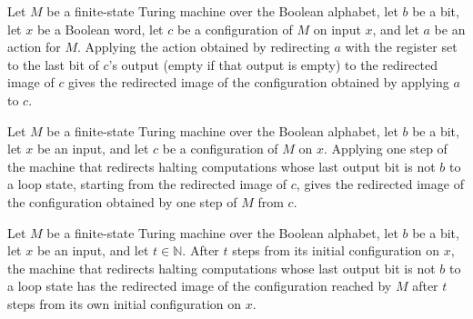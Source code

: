 \begin{lemma}
\label{Turing.FinTM.redirect_apply}
\leanok
{}
Let $M$ be a finite-state Turing machine over the Boolean alphabet, let $b$ be a bit,
let $x$ be a Boolean word, let $c$ be a configuration of $M$ on input $x$, and let $a$
be an action for $M$. Applying the action obtained by redirecting $a$ with the register
set to the last bit of $c$'s output (empty if that output is empty) to the redirected
image of $c$ gives the redirected image of the configuration obtained by applying $a$ to
$c$.
\end{lemma}

\begin{lemma}
\label{Turing.FinTM.redirect_step}
\leanok
{}
Let $M$ be a finite-state Turing machine over the Boolean alphabet, let $b$ be a bit,
let $x$ be an input, and let $c$ be a configuration of $M$ on $x$. Applying one step of
the machine that redirects halting computations whose last output bit is not $b$ to a
loop state, starting from the redirected image of $c$, gives the redirected image of the
configuration obtained by one step of $M$ from $c$.
\end{lemma}

\begin{lemma}
\label{Turing.FinTM.redirect_run}
\leanok
{}
Let $M$ be a finite-state Turing machine over the Boolean alphabet, let $b$ be a bit,
let $x$ be an input, and let $t \in \mathbb{N}$. After $t$ steps from its initial
configuration on $x$, the machine that redirects halting computations whose last output
bit is not $b$ to a loop state has the redirected image of the configuration reached by
$M$ after $t$ steps from its own initial configuration on $x$.
\end{lemma}

